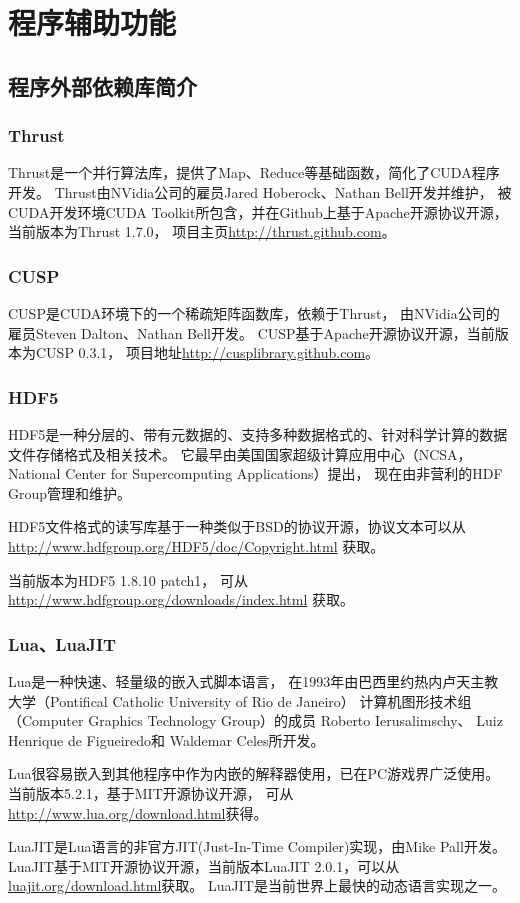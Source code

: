 
\chapter{程序辅助功能}

\section{程序外部依赖库简介}

\subsection{Thrust}

Thrust是一个并行算法库，提供了Map、Reduce等基础函数，简化了CUDA程序开发。
Thrust由NVidia公司的雇员Jared Hoberock、Nathan Bell开发并维护，
被CUDA开发环境CUDA Toolkit所包含，并在Github上基于Apache开源协议开源，
当前版本为Thrust 1.7.0，
项目主页\url{http://thrust.github.com}。

\subsection{CUSP}

CUSP是CUDA环境下的一个稀疏矩阵函数库，依赖于Thrust，
由NVidia公司的雇员Steven Dalton、Nathan Bell开发。
CUSP基于Apache开源协议开源，当前版本为CUSP 0.3.1，
项目地址\url{http://cusplibrary.github.com}。

\subsection{HDF5}

HDF5是一种分层的、带有元数据的、支持多种数据格式的、针对科学计算的数据文件存储格式及相关技术。
它最早由美国国家超级计算应用中心（NCSA， 
National Center for Supercomputing Applications）提出，
现在由非营利的HDF Group管理和维护。\cite{HDF5Wiki}

HDF5文件格式的读写库基于一种类似于BSD的协议开源，协议文本可以从
\url{http://www.hdfgroup.org/HDF5/doc/Copyright.html} 获取。

当前版本为HDF5 1.8.10 patch1，
可从\url{http://www.hdfgroup.org/downloads/index.html} 获取。

\subsection{Lua、LuaJIT }

Lua是一种快速、轻量级的嵌入式脚本语言，
在1993年由巴西里约热内卢天主教大学（Pontifical Catholic University of Rio de Janeiro）
计算机图形技术组（Computer Graphics Technology Group）的成员
Roberto Ierusalimschy、 Luiz Henrique de Figueiredo和 Waldemar Celes所开发。
\cite{LuaWiki}

Lua很容易嵌入到其他程序中作为内嵌的解释器使用，已在PC游戏界广泛使用。
当前版本5.2.1，基于MIT开源协议开源，
可从 \url{http://www.lua.org/download.html}获得。

LuaJIT是Lua语言的非官方JIT(Just-In-Time Compiler)实现，由Mike Pall开发。
LuaJIT基于MIT开源协议开源，当前版本LuaJIT 2.0.1，可以从\url{luajit.org/download.html}获取。
LuaJIT是当前世界上最快的动态语言实现之一。\cite{LuaJITHomepage}

